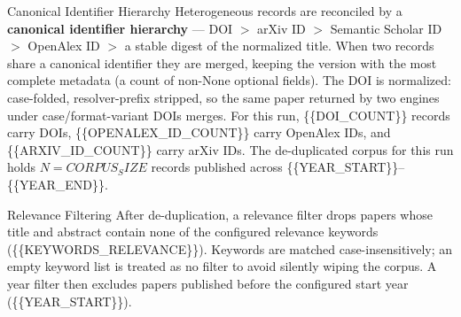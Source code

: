 \documentclass[
  ignorenonframetext,
]{beamer}
\begin{document}
\begin{frame}[allowframebreaks]{Canonical Identifier Hierarchy}
\label{canonical-identifier-hierarchy}
Heterogeneous records are reconciled by a \textbf{canonical identifier
hierarchy} --- DOI \(>\) arXiv ID \(>\) Semantic Scholar ID \(>\)
OpenAlex ID \(>\) a stable digest of the normalized title. When two
records share a canonical identifier they are merged, keeping the
version with the most complete metadata (a count of non-None optional
fields). The DOI is normalized: case-folded, resolver-prefix stripped,
so the same paper returned by two engines under case/format-variant DOIs
merges. For this run, \{\{DOI\_COUNT\}\} records carry DOIs,
\{\{OPENALEX\_ID\_COUNT\}\} carry OpenAlex IDs, and
\{\{ARXIV\_ID\_COUNT\}\} carry arXiv IDs. The de-duplicated corpus for
this run holds \(N = {{CORPUS_SIZE}}\) records published across
\{\{YEAR\_START\}\}--\{\{YEAR\_END\}\}.
\end{frame}

\begin{frame}[allowframebreaks]{Relevance Filtering}
\label{relevance-filtering}
After de-duplication, a relevance filter drops papers whose title and
abstract contain none of the configured relevance keywords
(\{\{KEYWORDS\_RELEVANCE\}\}). Keywords are matched case-insensitively;
an empty keyword list is treated as no filter to avoid silently wiping
the corpus. A year filter then excludes papers published before the
configured start year (\{\{YEAR\_START\}\}).
\end{frame}
\end{document}
